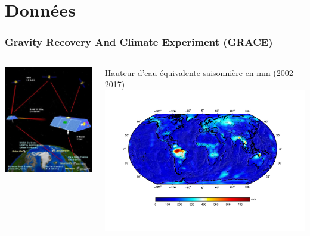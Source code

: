 \documentclass[9pt]{beamer}
\begin{document}
\section{Données}


\begin{frame}
\frametitle{Gravity Recovery And Climate Experiment (GRACE)}

\begin{columns}
        \begin{column}{0.2\textwidth}
        \centering
          \includegraphics[width=\textwidth]{figures/GRACE_satellites.jpg}
        \end{column}
        \begin{column}{0.8\textwidth}
        \centering
        Hauteur d'eau équivalente saisonnière en mm (2002-2017) \vspace*{-1cm}
          \includegraphics[width=\textwidth]{figures/global_map_grace.pdf} 

\end{column}
\end{columns}
\end{frame}
\end{document}
